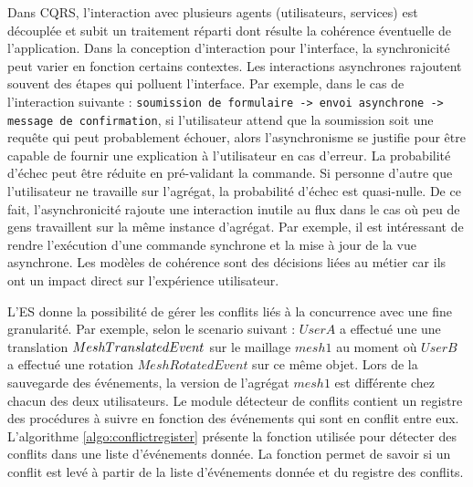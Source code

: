 Dans \gls{CQRS}, l'interaction avec plusieurs agents (utilisateurs, services) est 
découplée et subit un traitement réparti dont résulte la cohérence éventuelle de 
l'application. Dans la conception d'interaction pour l'interface, la synchronicité peut 
varier en fonction certains contextes. 
Les interactions asynchrones rajoutent souvent des étapes qui polluent l'interface.  
Par exemple, dans le cas de l'interaction suivante : \texttt{soumission de 
formulaire -> envoi asynchrone -> message de confirmation}, si l'utilisateur attend 
que la soumission soit une requête qui peut probablement échouer, alors 
l'asynchronisme se justifie pour être capable de fournir une explication à 
l'utilisateur en cas d'erreur. 
La probabilité d'échec peut être réduite en pré-validant la commande. Si personne 
d'autre que l'utilisateur ne travaille sur l'agrégat, la probabilité d'échec est 
quasi-nulle. 
De ce fait, l'asynchronicité rajoute une interaction inutile au flux dans le cas où 
peu de gens travaillent sur la même instance d'agrégat.
Par exemple, il est intéressant de rendre l'exécution d'une commande synchrone 
et la mise à jour de la vue asynchrone. 
Les modèles de cohérence sont des décisions liées au métier car ils ont un 
impact direct sur l'expérience utilisateur. 



L'\gls{ES} donne la possibilité de gérer les conflits liés à la concurrence avec une 
fine granularité. Par exemple, selon le scenario suivant :  $UserA$ a effectué une 
une translation $MeshTrans\-latedEvent$ sur le maillage 
$mesh1$ au moment où $UserB$ a effectué une rotation $MeshRotatedEvent$ sur ce 
même objet. Lors de la sauvegarde des événements, la version de l'agrégat 
$mesh1$ est différente chez chacun des deux utilisateurs. Le module détecteur de conflits 
contient un registre des procédures à suivre en fonction des événements qui sont en conflit entre eux. L'algorithme \ref{algo:conflictregister} 
présente la fonction utilisée pour détecter des conflits dans une liste d'événements donnée. La fonction permet de savoir si un conflit est 
levé à partir de la liste d'événements donnée et du registre des conflits.

